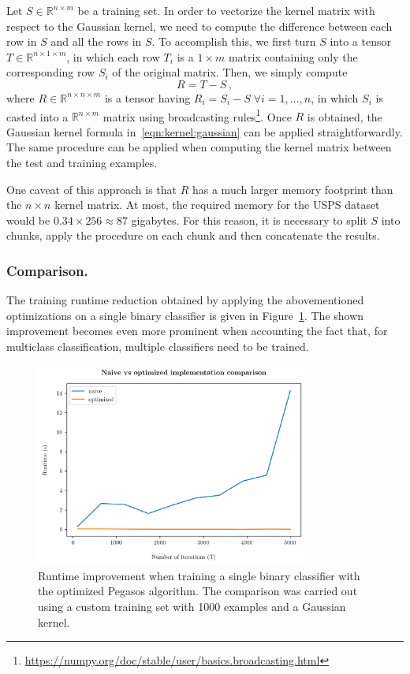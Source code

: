 \documentclass[runningheads]{llncs}
\begin{document}
Let $S \in \mathbb{R}^{n \times m}$ be a training set. In order to vectorize the kernel matrix with respect to the Gaussian kernel, we need to compute the difference between each row in $S$ and all the rows in $S$. To accomplish this, we first turn $S$ into a tensor $T \in \mathbb{R}^{n \times 1 \times m}$, in which each row $T_i$ is a $1 \times m$ matrix containing only the corresponding row $S_i$ of the original matrix. Then, we simply compute
\[
  R = T - S \, ,
\]
where $R \in \mathbb{R}^{n \times n \times m}$ is a tensor having $R_i = S_i - S \; \forall i=1,\dots,n$, in which $S_i$ is casted into a $\mathbb{R}^{n \times m}$ matrix using broadcasting rules\footnote{\url{https://numpy.org/doc/stable/user/basics.broadcasting.html}}. Once $R$ is obtained, the Gaussian kernel formula in~\ref{eqn:kernel:gaussian} can be applied straightforwardly. The same procedure can be applied when computing the kernel matrix between the test and training examples.

One caveat of this approach is that $R$ has a much larger memory footprint than the $n \times n$ kernel matrix. At most, the required memory for the USPS dataset would be $0.34 \times 256 \approx 87$ gigabytes. For this reason, it is necessary to split $S$ into chunks, apply the procedure on each chunk and then concatenate the results.

\subsubsection{Comparison.} The training runtime reduction obtained by applying the abovementioned optimizations on a single binary classifier is given in Figure~\ref{fig:algorithm:runtime}. The shown improvement becomes even more prominent when accounting the fact that, for multiclass classification, multiple classifiers need to be trained.

\begin{figure}
  \center
  \includegraphics[width=0.8\textwidth]{../img/runtime.png}
  \caption{Runtime improvement when training a single binary classifier with the optimized Pegasos algorithm. The comparison was carried out using a custom training set with 1000 examples and a Gaussian kernel.} 
  \label{fig:algorithm:runtime}
\end{figure}
\end{document}

